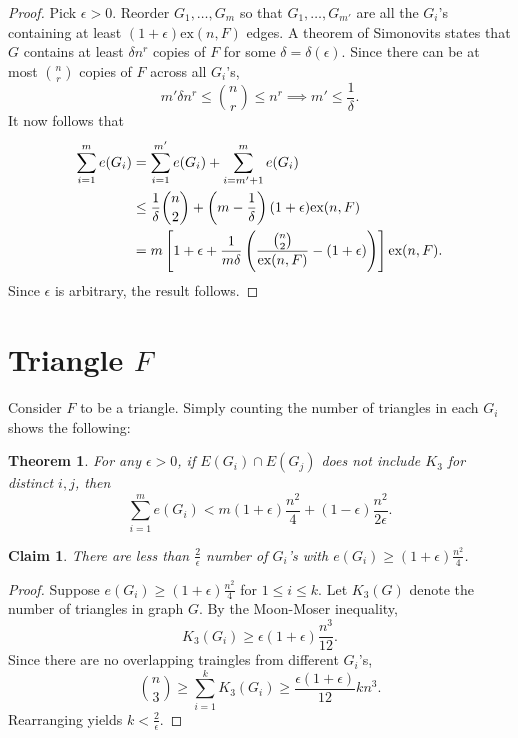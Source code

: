 \documentclass[12pt]{report}
\newtheorem{theorem}{Theorem}[chapter]
\newtheorem{claim}{Claim}[theorem]
\begin{document}
\begin{proof}
  Pick $\epsilon > 0$. Reorder $G_1, \ldots, G_m$ so that $G_1, \ldots, G_{m'}$ are all the $G_i$'s
  containing at least $(1 + \epsilon)\text{ex}(n, F)$ edges. A theorem of Simonovits states that $G$
  contains at least $\delta n^r$ copies of $F$ for some $\delta = \delta(\epsilon)$. Since there can
  be at most $\binom{n}{r}$ copies of $F$ across all $G_i$'s, 
  \[
    m'\delta n^{r} \leq \binom{n}{r} \leq n^r \implies m' \leq \frac{1}{\delta}.
  \]
  It now follows that
  \begin{align*}
    \sum_{i = 1}^m e(G_i) 
    &= \sum_{i = 1}^{m'} e(G_i) + \sum_{i = m' + 1}^m e(G_i) \\
    &\leq \frac{1}{\delta}\binom{n}{2} + \left(m - \frac{1}{\delta}\right)(1 + \epsilon)\text{ex}(n, F) \\
    &= m\left[1 + \epsilon + \frac{1}{m\delta}\left(\frac{\binom{n}{2}}{\textnormal{ex}(n, F)} - (1 + \epsilon)\right)\right]\textnormal{ex}(n, F).
  \end{align*}
  Since $\epsilon$ is arbitrary, the result follows.
\end{proof}


\section{Triangle $F$}

Consider $F$ to be a triangle. Simply counting the number of triangles in each $G_i$ shows the
following:

\begin{theorem}
	For any $\epsilon > 0$, if $E(G_i) \cap E(G_j)$ does not include $K_3$ for distinct $i, j$, then
	\[
		\sum_{i = 1}^m  e(G_i) < m(1 + \epsilon)\frac{n^2}{4} + (1 - \epsilon)\frac{n^2}{2\epsilon}.
	\]
\end{theorem}

\begin{claim}
	There are less than $\frac{2}{\epsilon}$ number of $G_i$'s with $e(G_i) \geq (1 +
	\epsilon)\frac{n^2}{4}$.
\end{claim}

\begin{proof}
	Suppose $e(G_i) \geq (1 + \epsilon)\frac{n^2}{4}$ for $1\leq i \leq k$. Let $K_3(G)$ denote the
	number of triangles in graph $G$. By the Moon-Moser inequality,
	\[
		K_3(G_i) \geq \epsilon(1 + \epsilon)\frac{n^3}{12}.
	\]
	Since there are no overlapping traingles from different $G_i$'s, 
	\[
		\binom{n}{3} \geq \sum_{i = 1}^k K_3(G_i) \geq \frac{\epsilon(1 + \epsilon)}{12}kn^3.
	\]
	Rearranging yields $k < \frac{2}{\epsilon}$.
\end{proof}
\end{document}
